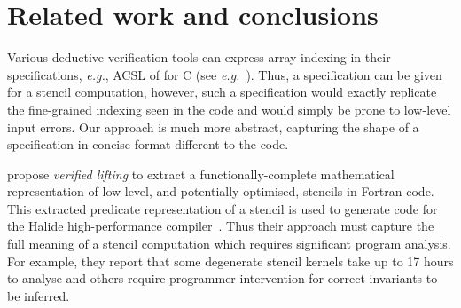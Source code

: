 \documentclass[10pt,preprint,numbers]{sigplanconf}
\theoremstyle{definition}
\newcommand{\eg}{\emph{e.g.}}
\begin{document}













\section{Related work and conclusions}
\label{sec:discussion}

Various deductive verification tools can express array indexing
in their specifications, \eg{}, ACSL of \citet{baudin2008acsl}
for C (see \eg{}~\citet[Example 3.4.1]{burghardt2010acsl}). Thus, a specification
can be given for a stencil computation, 
however, such a specification would exactly replicate the fine-grained
indexing seen in the code and would simply be prone to low-level input
errors. Our approach is much more abstract,
capturing the shape of a specification in concise format different to
the code. 

\citet{kamil2016verified} propose \emph{verified lifting} to extract a
functionally-complete mathematical representation of low-level, and
potentially optimised, stencils in Fortran code. This extracted
predicate representation of a stencil is used to generate code
for the \textsf{Halide} high-performance
compiler~\citep{ragan2013halide}. Thus their approach must capture the
full meaning of a stencil computation which requires significant
program analysis. For example, they report that some degenerate
stencil kernels take up to 17 hours to analyse and others require
programmer intervention for correct invariants to be inferred.

\end{document}
